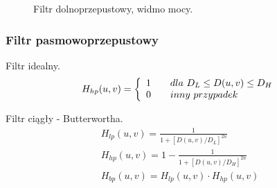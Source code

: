 \documentclass{classrep}
\begin{document}
 \begin{figure}[H]
  \centering
  \caption{Filtr dolnoprzepustowy, widmo mocy.}
  \label{fig_widmo_lena_hp}
\end{figure}

\subsubsection{Filtr pasmowoprzepustowy}

Filtr idealny.
\begin{equation}
  H_{hp}(u,v) = \left\{
  \begin{array}{l l}
    1 & \quad dla\ D_L \leq D(u,v) \leq D_H \\
    0 & \quad inny\ przypadek \\
  \end{array} \right.
\end{equation}

Filtr ciągły - Butterwortha.
\begin{eqnarray}
H_{lp}(u,v) = \frac{1}{1+ \left[ D(u,v) / D_L\right] ^{2n} }\\
H_{hp}(u,v) =1 - \frac{1}{1+ \left[ D(u,v) / D_H\right] ^{2n} }\\
H_{bp}(u,v) = H_{lp}(u,v) \cdot H_{hp}(u,v)
\end{eqnarray}
\end{document}
